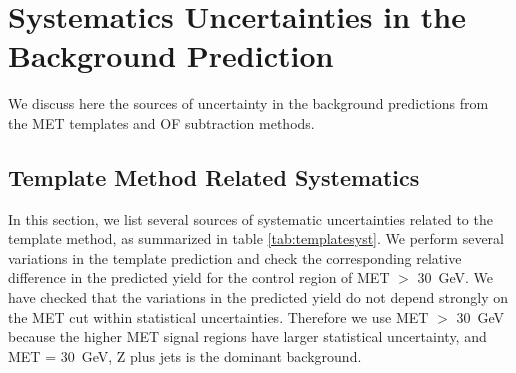 \section{Systematics Uncertainties in the Background Prediction}
\label{sec:systematics}

We discuss here the sources of uncertainty in the background predictions from 
the MET templates and OF subtraction methods.

\subsection{Template Method Related Systematics}
\label{sec:systematicstemp}

\newcommand{\tempmet}{30}

In this section, we list several sources of systematic uncertainties related to the template method,
as summarized in table \ref{tab:templatesyst}. We perform several variations in the 
template prediction
and check the corresponding relative difference in the predicted yield for the 
control region of MET $>$ \tempmet~GeV.
We have checked that the variations in the predicted yield do not depend strongly on the MET cut
within statistical uncertainties. 
Therefore we use MET $>$ \tempmet~GeV because the 
higher MET signal regions have
larger statistical uncertainty,
and MET = \tempmet~GeV, Z plus jets is the dominant background.

